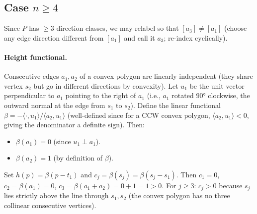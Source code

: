 \subsection*{Case $n\ge 4$}

Since $P$ has $\ge 3$ direction classes, we may relabel so that
$[a_3]\ne[a_1]$ (choose any edge direction different from $[a_1]$
and call it $a_3$; re-index cyclically).

\paragraph{Height functional.}
Consecutive edges $a_1,a_2$ of a convex polygon are linearly independent
(they share vertex $s_2$ but go in different directions by convexity).
Let $u_1$ be the unit vector perpendicular to $a_1$ pointing to the right of $a_1$
(i.e., $a_1$ rotated $90°$ clockwise, the outward normal at the edge from $s_1$ to $s_2$).
Define the linear functional $\beta=-\langle\cdot,u_1\rangle/\langle a_2,u_1\rangle$
(well-defined since for a CCW convex polygon, $\langle a_2,u_1\rangle<0$,
giving the denominator a definite sign).
Then:
\begin{itemize}
\item $\beta(a_1)=0$ (since $u_1\perp a_1$).
\item $\beta(a_2)=1$ (by definition of $\beta$).
\end{itemize}
Set $h(p)=\beta(p-t_1)$ and $c_j=\beta(s_j)=\beta(s_j-s_1)$.
Then $c_1=0$, $c_2=\beta(a_1)=0$, $c_3=\beta(a_1+a_2)=0+1=1>0$.
For $j\ge 3$: $c_j>0$ because $s_j$ lies strictly above the line through
$s_1,s_2$ (the convex polygon has no three collinear consecutive vertices).

